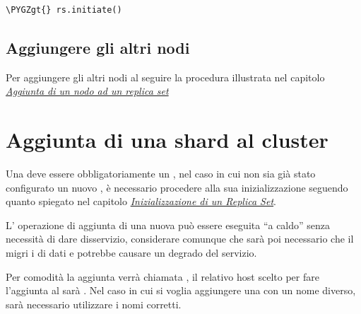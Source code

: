 \documentclass[a4paper,10pt,english]{sphinxmanual}
\def\PYGZgt{\char`\>}
\begin{document}
\begin{Verbatim}[commandchars=\\\{\}]
\PYGZgt{} rs.initiate()
\end{Verbatim}


\section{Aggiungere gli altri nodi}
\label{cluster_architecture/init_replica_set:aggiungere-gli-altri-nodi}
Per aggiungere gli altri nodi al {\hyperref[cluster_architecture/architecture:replica-set]{\emph{}}} seguire la procedura illustrata nel capitolo
{\hyperref[cluster_architecture/add_replica::doc]{\emph{\emph{Aggiunta di un nodo ad un replica set}}}}


\chapter{Aggiunta di una shard al cluster}
\label{cluster_architecture/add_shard:add-shard}\label{cluster_architecture/add_shard::doc}\label{cluster_architecture/add_shard:aggiunta-di-una-shard-al-cluster}
Una {\hyperref[cluster_architecture/architecture:shard]{\emph{}}} deve essere obbligatoriamente un {\hyperref[cluster_architecture/architecture:replica-set]{\emph{}}}, nel caso in cui non sia già
stato configurato un nuovo {\hyperref[cluster_architecture/architecture:replica-set]{\emph{}}}, è necessario procedere alla sua inizializzazione
seguendo quanto spiegato nel capitolo {\hyperref[cluster_architecture/init_replica_set::doc]{\emph{\emph{Inizializzazione di un Replica Set}}}}.

L' operazione di aggiunta di una nuova {\hyperref[cluster_architecture/architecture:shard]{\emph{}}} può essere eseguita ``a caldo'' senza necessità
di dare disservizio, considerare comunque che sarà poi necessario che il  migri i
 di dati e potrebbe causare un degrado del servizio.

Per comodità la {\hyperref[cluster_architecture/architecture:shard]{\emph{}}} aggiunta verrà chiamata , il relativo host scelto per
fare l'aggiunta al {\hyperref[cluster_architecture/architecture:cluster]{\emph{}}} sarà .
Nel caso in cui si voglia aggiungere una {\hyperref[cluster_architecture/architecture:shard]{\emph{}}} con un nome diverso, sarà necessario
utilizzare i nomi corretti.
\end{document}
